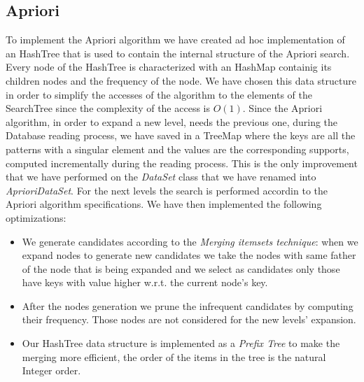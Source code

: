 \documentclass[11pt, a4paper]{article}
\begin{document}
		\subsection{Apriori}
			To implement the Apriori algorithm we have created ad hoc implementation of an HashTree that is used to contain the internal structure of the Apriori search. Every node of the HashTree is characterized with an HashMap containig its children nodes and the frequency of the node. 
			We have chosen this data structure in order to simplify the accesses of the algorithm to the elements of the SearchTree since the complexity of the access is $O(1)$.\newline
			Since the Apriori algorithm, in order to expand a new level, needs the previous one, during the Database reading process, we have saved in a TreeMap where the keys are all the patterns with a singular element and the values are the corresponding supports, computed incrementally during the reading process.\newline 
			This is the only improvement that we have performed on the \textit{DataSet} class that we have renamed into \textit{AprioriDataSet}.
			For the next levels the search is performed accordin to the Apriori algorithm specifications.
			\newline \newline
			We have then implemented the following optimizations:
			\begin{itemize}
				\item We generate candidates according to the \textit{Merging itemsets technique}: when we expand nodes to generate new candidates we take the nodes with same father of the node that is being expanded and we select as candidates only those have keys with value higher w.r.t. the current node's key.
				\item After the nodes generation we prune the infrequent candidates by computing their frequency. Those nodes are not considered for the new levels' expansion.
				\item Our HashTree data structure is implemented as a \textit{Prefix Tree} to make the merging more efficient, the order of the items in the tree is the natural Integer order.
			\end{itemize}
\end{document}
